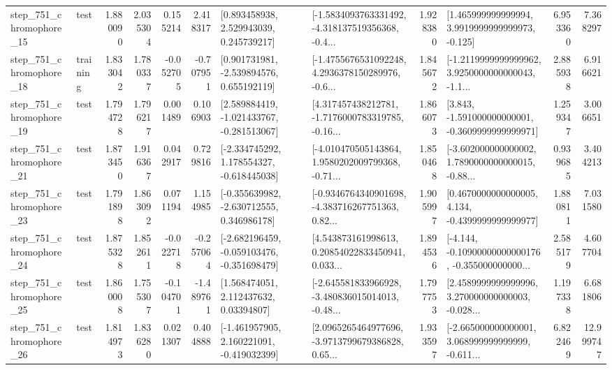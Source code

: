 \begin{tabular}{llrrrrllrlrr}
  step\_751\_chromophore\_15 &      test &      1.880090 &    2.035304 &      0.155214 &  2.418317 &     [0.893458938, 2.529943039, 0.245739217] &  [-1.5834093763331492, -4.318137519356368, -0.4... &       1.928380 &    [1.465999999999994, 3.9919999999999973, -0.125] &            6.953360 &          7.368297 \\
  step\_751\_chromophore\_18 &  training &      1.833042 &    1.780337 &     -0.052705 & -0.707951 &    [0.901731981, -2.539894576, 0.655192119] &  [-1.4755676531092248, 4.2936378150289976, -0.6... &       1.845672 &  [-1.2119999999999962, 3.9250000000000043, -1.1... &            2.885938 &          6.916621 \\
  step\_751\_chromophore\_19 &      test &      1.794728 &    1.796217 &      0.001489 &  0.106903 &   [2.589884419, -1.021433767, -0.281513067] &  [4.317457438212781, -1.7176000783319785, -0.16... &       1.866073 &   [3.843, -1.591000000000001, -0.3609999999999971] &            1.259347 &          3.006651 \\
  step\_751\_chromophore\_21 &      test &      1.873450 &    1.916367 &      0.042917 &  0.729816 &   [-2.334745292, 1.178554327, -0.618445038] &  [-4.010470505143864, 1.9580202009799368, -0.71... &       1.850468 &  [-3.602000000000002, 1.7890000000000015, -0.88... &            0.939685 &          3.404213 \\
  step\_751\_chromophore\_23 &      test &      1.791898 &    1.863092 &      0.071194 &  1.154985 &   [-0.355639982, -2.630712555, 0.346986178] &  [-0.9346764340901698, -4.383716267751363, 0.82... &       1.905997 &   [0.4670000000000005, 4.134, -0.4399999999999977] &            1.880811 &          7.031580 \\
  step\_751\_chromophore\_24 &      test &      1.875328 &    1.852611 &     -0.022718 & -0.257064 &  [-2.682196459, -0.059103476, -0.351698479] &  [4.543873161998613, 0.20854022833450941, 0.033... &       1.894536 &  [-4.144, -0.10900000000000176, -0.355000000000... &            2.585179 &          4.607704 \\
  step\_751\_chromophore\_25 &      test &      1.860008 &    1.755307 &     -0.104701 & -1.489761 &      [1.568474051, 2.112437632, 0.03394807] &  [-2.645581833966928, -3.480836015014013, -0.48... &       1.797753 &  [2.4589999999999996, 3.270000000000003, -0.028... &            1.197338 &          6.681806 \\
  step\_751\_chromophore\_26 &      test &      1.814973 &    1.836280 &      0.021307 &  0.404888 &   [-1.461957905, 2.160221091, -0.419032399] &  [2.0965265464977696, -3.9713799679386828, 0.65... &       1.933597 &  [-2.665000000000001, 3.068999999999999, -0.611... &            6.822469 &         12.999747 \\

\end{tabular}

